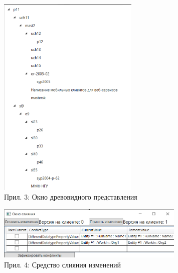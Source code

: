 \documentclass[12pt]{article}
\begin{document}
\begin{figure}
    \centering
    \includegraphics[width=0.6\textwidth]{_images/tree_view.png}
    \caption*{Прил. 3: Окно древовидного представления}
    \label{app:tree_view}
\end{figure}

\begin{figure}
    \centering
    \includegraphics[width=0.8\textwidth]{_images/merge_tool.png}
    \caption*{Прил. 4: Средство слияния изменений}
    \label{app:merge_tool}
\end{figure}
\pagebreak
\end{document}
